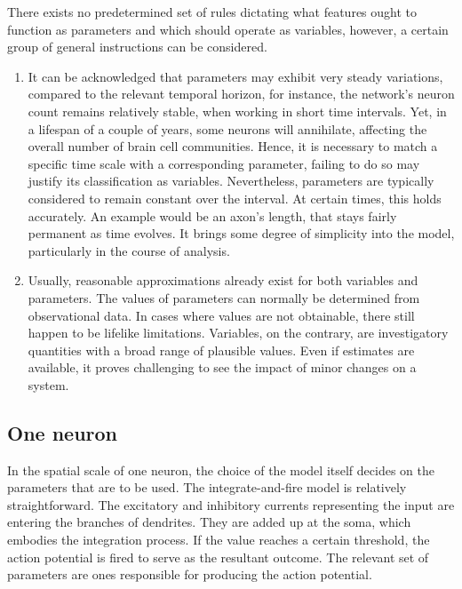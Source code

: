 \documentclass[../../Orator]{subfiles}
\begin{document}
There exists no predetermined set of rules dictating what features ought to function as parameters and which should operate as variables, however, a certain group of general instructions can be considered. 
\begin{enumerate}
\item It can be acknowledged that parameters may exhibit very steady variations, compared to the relevant temporal horizon, for instance, the network's neuron count remains relatively stable, when working in short time intervals. Yet, in a lifespan of a couple of years, some neurons will annihilate, affecting the overall number of brain cell communities. Hence, it is necessary to match a specific time scale with a corresponding parameter, failing to do so may justify its classification as variables. Nevertheless, parameters are typically considered to remain constant over the interval. At certain times, this holds accurately. An example would be an axon’s length, that stays fairly permanent as time evolves. It brings some degree of simplicity into the model, particularly in the course of analysis. 
\item Usually, reasonable approximations already exist for both variables and parameters. The values of parameters can normally be determined from observational data. In cases where values are not obtainable, there still happen to be lifelike limitations. Variables, on the contrary, are investigatory quantities with a broad range of plausible values. Even if estimates are available, it proves challenging to see the impact of minor changes on a system. 
\end{enumerate}

\subsection{One neuron}

In the spatial scale of one neuron, the choice of the model itself decides on the parameters that are to be used. The integrate-and-fire model is relatively straightforward. The excitatory and inhibitory currents representing the input are entering the branches of dendrites. They are added up at the soma, which embodies the integration process. If the value reaches a certain threshold, the action potential is fired to serve as the resultant outcome. The relevant set of parameters are ones responsible for producing the action potential. 
\end{document}
